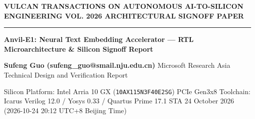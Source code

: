 \documentclass[11pt,a4paper]{article}
\begin{document}
{\scriptsize\sffamily\textcolor{vulcan}{\textbf{VULCAN TRANSACTIONS ON AUTONOMOUS AI-TO-SILICON ENGINEERING \hfill VOL. 2026 \textperiodcentered{} ARCHITECTURAL SIGNOFF PAPER}}\par}

\vspace{1pt}\textcolor{vulcan}{\rule{\textwidth}{1.2pt}}\vspace{4pt}

\begin{center}

{\sffamily\LARGE\bfseries Anvil-E1: Neural Text Embedding Accelerator — RTL Microarchitecture \& Silicon Signoff Report\par}\vspace{3pt}

{\small\sffamily\textbf{Sufeng Guo (\allowbreak{}sufeng\_\allowbreak{}guo@smail.nju.edu.cn)\allowbreak{}} \textperiodcentered{} Microsoft Research Asia \textperiodcentered{} Technical Design and Verification Report\par}\vspace{1pt}

{\scriptsize\sffamily\textcolor{black!75}{Silicon Platform: Intel Arria 10 GX (\texttt{10AX115N3F40E2SG}) PCIe Gen3x8 \textperiodcentered{} Toolchain: Icarus Verilog 12.0 / Yosys 0.33 / Quartus Prime 17.1 STA \textperiodcentered{} 24 October 2026 (\allowbreak{}2026-10-24 20:12 UTC+\allowbreak{}8 Beijing Time)\allowbreak{}}\par}

\end{center}\vspace{2pt}
\end{document}
